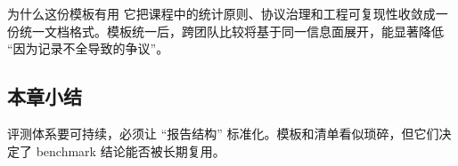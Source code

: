 \begin{knowledgebox}{为什么这份模板有用}
它把课程中的统计原则、协议治理和工程可复现性收敛成一份统一文档格式。模板统一后，跨团队比较将基于同一信息面展开，能显著降低 ``因为记录不全导致的争议''。
\end{knowledgebox}

\subsection{本章小结}
评测体系要可持续，必须让 ``报告结构'' 标准化。模板和清单看似琐碎，但它们决定了 benchmark 结论能否被长期复用。

